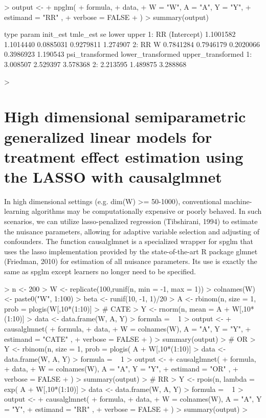 \documentclass{article}
\begin{document}
\begin{Schunk}
\begin{Sinput}
> output <-
+   npglm(
+     formula,
+     data,
+     W = "W", A = "A", Y = "Y",
+     estimand = "RR" ,
+     verbose = FALSE
+   )
> summary(output)
\end{Sinput}
\begin{Soutput}
   type       param  init_est  tmle_est        se     lower    upper
1:   RR (Intercept) 1.1001582 1.1014440 0.0885031 0.9279811 1.274907
2:   RR           W 0.7841284 0.7946179 0.2020066 0.3986923 1.190543
   psi_transformed lower_transformed upper_transformed
1:        3.008507          2.529397          3.578368
2:        2.213595          1.489875          3.288868
\end{Soutput}
\begin{Sinput}
> 
\end{Sinput}
\end{Schunk}


\section{High dimensional semiparametric generalized linear models for treatment effect estimation using the LASSO with causalglmnet}
In high dimensional settings (e.g. dim(W) >= 50-1000), conventional machine-learning algorithms may be computationally expensive or poorly behaved. In such scenarios, we can utilize lasso-penalized regression (Tibshirani, 1994) to estimate the nuisance parameters, allowing for adaptive variable selection and adjusting of confounders. The function causalglmnet is a specialized wrapper for spglm that uses the lasso implementation provided by the state-of-the-art R package glmnet (Friedman, 2010) for estimation of all nuisance parameters.\nocite{Friedman2010}\nocite{Tibshirani94regressionshrinkage} Its use is exactly the same as spglm except learners no longer need to be specified.

\begin{Schunk}
\begin{Sinput}
> n <- 200
> W <- replicate(100,runif(n, min = -1,  max = 1))
> colnames(W) <- paste0("W", 1:100)
> beta <- runif(10, -1, 1)/20
> A <- rbinom(n, size = 1, prob = plogis(W[,10*(1:10)] %*% beta))
> # CATE
> Y <- rnorm(n, mean = A + W[,10*(1:10)] %*% beta, sd = 0.5)
> data <- data.frame(W, A, Y)
> formula = ~ 1  
> output <-
+   causalglmnet(
+     formula,
+     data,
+     W = colnames(W), A = "A", Y = "Y",
+     estimand = "CATE" ,
+     verbose = FALSE
+   )
> summary(output)
> # OR
> Y <- rbinom(n, size =  1, prob = plogis( A + W[,10*(1:10)] %*% beta))
> data <- data.frame(W, A, Y)
> formula  = ~ 1  
> output <-
+   causalglmnet(
+     formula,
+     data,
+     W = colnames(W), A = "A", Y = "Y",
+     estimand = "OR" ,
+     verbose = FALSE
+   )
> summary(output)
> # RR
> Y <- rpois(n, lambda = exp( A + W[,10*(1:10)] %*% beta))
> data <- data.frame(W, A, Y)
> formula  = ~ 1  
> output <-
+   causalglmnet(
+     formula,
+     data,
+     W = colnames(W), A = "A", Y = "Y",
+     estimand = "RR" ,
+     verbose = FALSE
+   )
> summary(output)
> 
\end{Sinput}
\end{Schunk}
\end{document}
